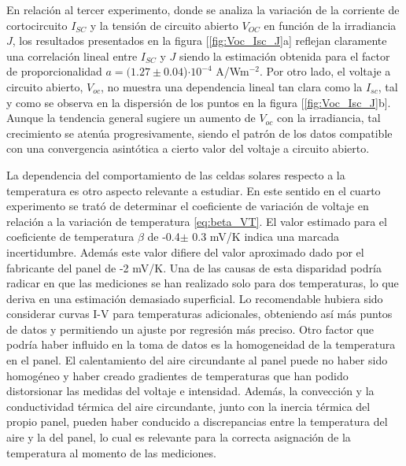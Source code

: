 \vspace{\baselineskip}	

En relación al tercer experimento, donde se analiza la variación de la corriente de cortocircuito $I_{SC}$ y la tensión de circuito abierto $V_{OC}$ en función de la irradiancia $J$, los resultados presentados en la figura [\ref{fig:Voc_Isc_J}a] reflejan  claramente una correlación lineal entre $I_{SC}$ y $J$ siendo la estimación obtenida para el factor de proporcionalidad $a=(1.27\pm0.04$)$\cdot10^{-4}$ A/Wm$^{-2}$.  Por otro lado, el voltaje a circuito abierto, $V_{oc}$, no muestra una dependencia lineal tan clara como la $I_{sc}$, tal y como se observa en la dispersión de los puntos en la figura [\ref{fig:Voc_Isc_J}b]. Aunque la tendencia general sugiere un aumento de $V_{oc}$ con la irradiancia, tal crecimiento se atenúa progresivamente, siendo el patrón de los datos compatible con una convergencia asintótica a cierto valor del voltaje a circuito abierto.

\vspace{\baselineskip}	

La dependencia del comportamiento de las celdas solares respecto a la temperatura es otro aspecto relevante a estudiar. En este sentido en el cuarto experimento se trató de determinar el coeficiente de variación de voltaje en relación a la variación de temperatura \ref{eq:beta_VT}. El valor estimado para el coeficiente de temperatura $\beta$ de -0.4$\pm$ 0.3 mV/K indica una marcada incertidumbre. Además este valor difiere del valor aproximado dado por el fabricante del panel de -2 mV/K. Una de las causas de esta disparidad podría radicar en que las mediciones se han realizado solo para dos temperaturas, lo que deriva en una estimación demasiado superficial. Lo recomendable hubiera sido considerar curvas I-V para temperaturas adicionales, obteniendo así más puntos de datos y permitiendo un ajuste por regresión más preciso. Otro factor que podría haber influido en la toma de datos es la homogeneidad de la temperatura en el panel. El calentamiento del aire circundante al panel puede no haber sido homogéneo y haber creado gradientes de temperaturas que han podido distorsionar las medidas del voltaje e intensidad. Además, la convección y la conductividad térmica del aire circundante, junto con la inercia térmica del propio panel, pueden haber conducido a discrepancias entre la temperatura del aire y la del panel, lo cual es relevante para la correcta asignación de la temperatura al momento de las mediciones.

\vspace{\baselineskip}	

